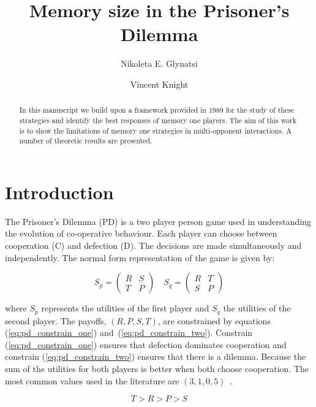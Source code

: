 \documentclass[10pt]{article}
\title{Memory size in the Prisoner's Dilemma}
\author{Nikoleta E. Glynatsi \and Vincent Knight}
\date{}
\begin{document}
\maketitle

\begin{abstract}

In this manuscript we build upon a framework provided in 1989 for the study of
these strategies and identify the best responses of memory one players. The aim
of this work is to show the limitations of memory one strategies in multi-opponent
interactions. A number of theoretic results are presented.
\end{abstract}

\section{Introduction}\label{section:introduction}

The Prisoner's Dilemma (PD) is a two player person game used in understanding the
evolution of co-operative behaviour. Each player can choose between cooperation
(C) and defection (D). The decisions are made simultaneously and independently.
The normal form representation of the game is given by:

\begin{equation}\label{equ:pd_definition}
    S_p = \begin{pmatrix}
    R & S  \\
    T & P
    \end{pmatrix} \quad
    S_q = \begin{pmatrix}
        R & T  \\
        S & P
        \end{pmatrix}
\end{equation}

where \(S_p\) represents the utilities of the first player and \(S_q\) the utilities
of the second player. The payoffs, \((R, P, S, T)\), are constrained by equations
(\ref{eq:pd_constrain_one}) and~(\ref{eq:pd_constrain_two}). Constrain
(\ref{eq:pd_constrain_one}) ensures that defection dominates cooperation and
constrain (\ref{eq:pd_constrain_two}) ensures that there is a dilemma. Because
the sum of the utilities for both players is better when both choose cooperation.
The most common values used in the literature are \((3, 1, 0, 5)\)~\cite{Axelrod1981}.

\begin{equation}\label{eq:pd_constrain_one}
    T > R > P > S 
\end{equation}
\end{document}
